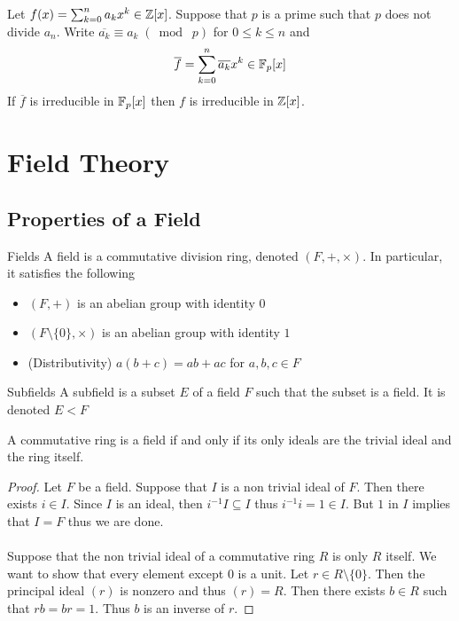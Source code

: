 \documentclass[a4paper]{article}
\begin{document}
\begin{thm}{}{} Let $f(x)=\sum_{k=0}^na_kx^k\in\mathbb{Z}[x]$. Suppose that $p$ is a prime such that $p$ does not divide $a_n$. Write $\overline{a_k}\equiv a_k\;(\bmod\;p)$ for $0\leq k\leq n$ and $$\overline{f}=\sum_{k=0}^n\overline{a_k}x^k\in\mathbb{F}_p[x]$$ If $\overline{f}$ is irreducible in $\mathbb{F}_p[x]$ then $f$ is irreducible in $\mathbb{Z}[x]$. 
\end{thm}


\pagebreak

\section{Field Theory}
\subsection{Properties of a Field}
\begin{defn}{Fields}{} A field is a commutative division ring, denoted $(F,+,\times)$. In particular, it satisfies the following
\begin{itemize}
\item $(F,+)$ is an abelian group with identity $0$
\item $(F\setminus\{0\},\times)$ is an abelian group with identity $1$
\item (Distributivity) $a(b+c)=ab+ac$ for $a,b,c\in F$
\end{itemize}
\end{defn}

\begin{defn}{Subfields}{} A subfield is a subset $E$ of a field $F$ such that the subset is a field. It is denoted $E<F$
\end{defn}

\begin{prp}{}{} A commutative ring is a field if and only if its only ideals are the trivial ideal and the ring itself. \tcbline
\begin{proof}
Let $F$ be a field. Suppose that $I$ is a non trivial ideal of $F$. Then there exists $i\in I$. Since $I$ is an ideal, then $i^{-1}I\subseteq I$ thus $i^{-1}i=1\in I$. But $1$ in $I$ implies that $I=F$ thus we are done. \\~\\
Suppose that the non trivial ideal of a commutative ring $R$ is only $R$ itself. We want to show that every element except $0$ is a unit. Let $r\in R\setminus\{0\}$. Then the principal ideal $(r)$ is nonzero and thus $(r)=R$. Then there exists $b\in R$ such that $rb=br=1$. Thus $b$ is an inverse of $r$. 
\end{proof}
\end{prp}
\end{document}
